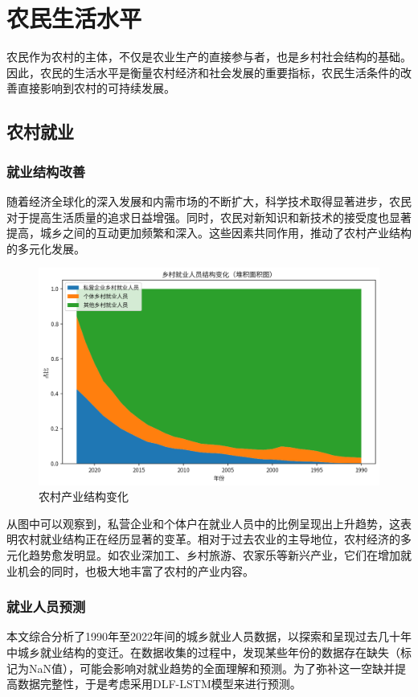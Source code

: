 \chapter{农民生活水平}
\label{chapter:famer}
农民作为农村的主体，不仅是农业生产的直接参与者，也是乡村社会结构的基础。因此，农民的生活水平是衡量农村经济和社会发展的重要指标，农民生活条件的改善直接影响到农村的可持续发展。
\section{农村就业}
\subsection{就业结构改善}
随着经济全球化的深入发展和内需市场的不断扩大，科学技术取得显著进步，农民对于提高生活质量的追求日益增强。同时，农民对新知识和新技术的接受度也显著提高，城乡之间的互动更加频繁和深入。这些因素共同作用，推动了农村产业结构的多元化发展。

\begin{figure}[h]
    \centering
    \includegraphics[width=0.75\linewidth]{figures/20.png}
    \caption{农村产业结构变化}
    \label{fig:struct_change}
\end{figure}

从图中可以观察到，私营企业和个体户在就业人员中的比例呈现出上升趋势，这表明农村就业结构正在经历显著的变革。相对于过去农业的主导地位，农村经济的多元化趋势愈发明显。如农业深加工、乡村旅游、农家乐等新兴产业，它们在增加就业机会的同时，也极大地丰富了农村的产业内容。

\subsection{就业人员预测}
本文综合分析了1990年至2022年间的城乡就业人员数据，以探索和呈现过去几十年中城乡就业结构的变迁。在数据收集的过程中，发现某些年份的数据存在缺失（标记为NaN值），可能会影响对就业趋势的全面理解和预测。为了弥补这一空缺并提高数据完整性，于是考虑采用DLF-LSTM模型来进行预测。


